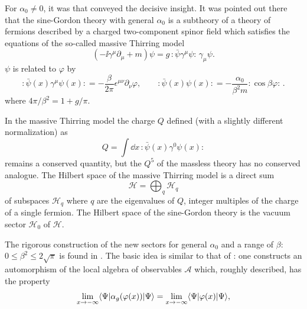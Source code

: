 For $\alpha_0\ne0$, it was \cite{pct-app-77} that conveyed the decisive insight.  It was
pointed out there that the sine-Gordon theory with general $\alpha_0$ is a
subtheory of a theory of fermions described by a charged two-component
spinor field which satisfies the equations of the so-called massive Thirring
model
\begin{equation*}
  (-\ii\gamma^\mu\partial_\mu+m)\psi
  =g\,:\!\bar\psi\gamma^\mu\psi\!:\,\gamma_\mu\psi.
\end{equation*}
$\psi$ is related to $\varphi$ by
\begin{equation*}
  :\!\bar\psi(x)\gamma^\mu\psi(x)\!:
  =-\frac{\beta}{2\pi}\epsilon^{\mu\nu}\partial_\nu\varphi,
  \qquad
  :\!\bar\psi(x)\psi(x)\!:
  =-\frac{\alpha_0}{\beta^2m}:\!\cos\beta\varphi\!:\,.
\end{equation*}
where $4\pi/\beta^2=1+g/\pi$.

In the massive Thirring model the charge $Q$ defined (with a slightly
different normalization) as
\begin{equation*}
  Q=\int\dd x\,:\!\bar\psi(x)\gamma^0\psi(x)\!:
\end{equation*}
remains a conserved quantity, but the $Q^5$ of the massless theory has no
conserved analogue.  The Hilbert space of the massive Thirring model is a
direct sum
\begin{equation*}
  \mathcal H=\bigoplus_q\mathcal H_q
\end{equation*}
of subspaces $\mathcal H_q$ where $q$ are the eigenvalues of $Q$, integer
multiples of the charge of a single fermion.  The Hilbert space of the
sine-Gordon theory is the vacuum sector $\mathcal H_0$ of $\mathcal H$.

The rigorous construction of the new sectors for general $\alpha_0$ and a
range of $\beta$: $0\leq\beta^2\leq2\sqrt{\pi}$ is found in \cite{pct-app-78,pct-app-79,pct-app-80,pct-app-81,pct-app-82}.  The
basic idea is similar to that of \cite{pct-app-72}: one constructs an automorphism of the
local algebra of observables $\mathcal A$ which, roughly described, has the
property
\begin{equation*}
  \lim_{x\to-\infty}
  \langle \Psi\vert \alpha_g(\varphi(x))\vert \Psi\rangle
  =\lim_{x\to-\infty}\langle \Psi\vert \varphi(x)\vert \Psi\rangle,
\end{equation*}

